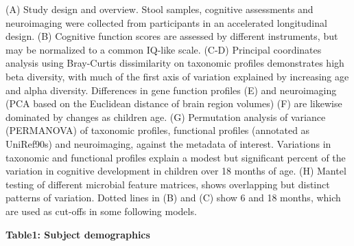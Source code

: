 (A) Study design and overview. Stool samples, cognitive assessments and
neuroimaging were collected from participants in an accelerated
longitudinal design. (B) Cognitive function scores are assessed by
different instruments, but may be normalized to a common IQ-like scale.
(C-D) Principal coordinates analysis using Bray-Curtis dissimilarity on
taxonomic profiles demonstrates high beta diversity, with much of the
first axis of variation explained by increasing age and alpha diversity.
Differences in gene function profiles (E) and neuroimaging (PCA based on
the Euclidean distance of brain region volumes) (F) are likewise
dominated by changes as children age. (G) Permutation analysis of
variance (PERMANOVA) of taxonomic profiles, functional profiles
(annotated as UniRef90s) and neuroimaging, against the metadata of
interest. Variations in taxonomic and functional profiles explain a
modest but significant percent of the variation in cognitive development
in children over 18 months of age. (H) Mantel testing of different
microbial feature matrices, shows overlapping but distinct patterns of
variation. Dotted lines in (B) and (C) show 6 and 18 months, which are
used as cut-offs in some following models.

\textbf{Table1: Subject demographics}


